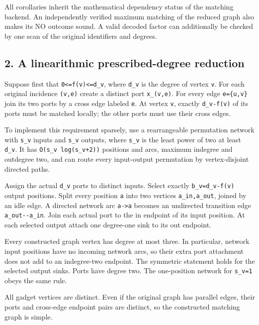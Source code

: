 All corollaries inherit the mathematical dependency status of the matching backend. An independently verified maximum matching of the reduced graph also makes its NO outcome sound. A valid decoded factor can additionally be checked by one scan of the original identifiers and degrees.

\hypertarget{af-9f2952a6d0-a-linearithmic-prescribed-degree-reduction}{%
\subsection{2. A linearithmic prescribed-degree reduction}\label{af-9f2952a6d0-a-linearithmic-prescribed-degree-reduction}}

Suppose first that \texttt{0\textless{}=f(v)\textless{}=d\_v}, where \texttt{d\_v} is the degree of vertex \texttt{v}. For each original incidence \texttt{(v,e)} create a distinct port \texttt{x\_(v,e)}. For every edge \texttt{e=\{u,v\}} join its two ports by a cross edge labeled \texttt{e}. At vertex \texttt{v}, exactly \texttt{d\_v-f(v)} of its ports must be matched locally; the other ports must use their cross edges.

To implement this requirement sparsely, use a rearrangeable permutation network with \texttt{s\_v} inputs and \texttt{s\_v} outputs, where \texttt{s\_v} is the least power of two at least \texttt{d\_v}. It has \texttt{O(s\_v\ log(s\_v+2))} positions and arcs, maximum indegree and outdegree two, and can route every input-output permutation by vertex-disjoint directed paths.

Assign the actual \texttt{d\_v} ports to distinct inputs. Select exactly \texttt{b\_v=d\_v-f(v)} output positions. Split every position \texttt{a} into two vertices \texttt{a\_in,a\_out}, joined by an idle edge. A directed network arc \texttt{a-\textgreater{}a\textquotesingle{}} becomes an undirected transition edge \texttt{a\_out-\/-a\textquotesingle{}\_in}. Join each actual port to the in endpoint of its input position. At each selected output attach one degree-one sink to its out endpoint.

Every constructed graph vertex has degree at most three. In particular, network input positions have no incoming network arcs, so their extra port attachment does not add to an indegree-two endpoint. The symmetric statement holds for the selected output sinks. Ports have degree two. The one-position network for \texttt{s\_v=1} obeys the same rule.

All gadget vertices are distinct. Even if the original graph has parallel edges, their ports and cross-edge endpoint pairs are distinct, so the constructed matching graph is simple.

